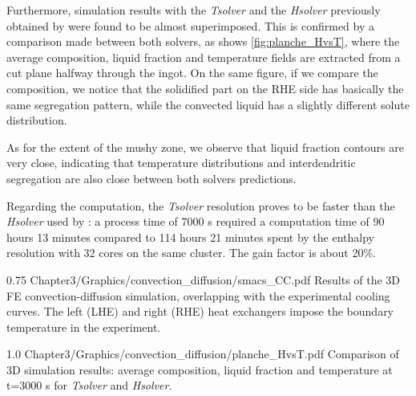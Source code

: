 Furthermore, simulation results with the \emph{Tsolver} and the \emph{Hsolver} 
previously obtained by \citet{carozzani_direct_2013} were 
found to be almost superimposed. This is confirmed by a comparison made 
between both solvers, as shows \cref{fig:planche_HvsT}, where the average composition, 
liquid fraction and temperature fields are extracted from a cut plane halfway through the ingot. 
On the same figure, if we compare the composition, we notice that the solidified part on the RHE 
side has basically the same segregation pattern, while the convected liquid has a slightly different 
solute distribution. 

As for the extent of the mushy zone, we observe that liquid
fraction contours are very close, indicating that temperature distributions and interdendritic segregation are also close between 
both solvers predictions. 

Regarding the computation, the \emph{Tsolver} resolution proves to be 
faster than the \emph{Hsolver} used by \citet{carozzani_direct_2013}: a process time of 7000 s required a computation time of 90 hours 
13 minutes compared to 114 hours 21 minutes spent by the enthalpy resolution with 32 cores on the same cluster. The gain factor 
is about 20\%.

\begin{figureth}
{0.75}
{Chapter3/Graphics/convection_diffusion/smacs_CC.pdf}
{Results of the 3D FE convection-diffusion simulation, overlapping with the experimental cooling curves.
The left (LHE) and right (RHE) heat exchangers impose the boundary temperature in the experiment.}
\label{fig:validation_convectiondiffusion}
\end{figureth}

\begin{figureth}
{1.0}
{Chapter3/Graphics/convection_diffusion/planche_HvsT.pdf}
{Comparison of 3D simulation results: average composition, liquid fraction and temperature at t=3000 s for \emph{Tsolver} and \emph{Hsolver}.}
\label{fig:planche_HvsT}
\end{figureth}

